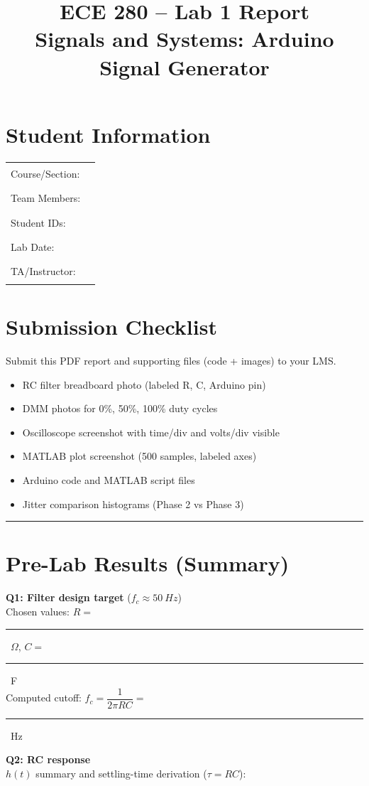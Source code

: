 \documentclass[11pt,letterpaper]{article}
\title{ECE 280 -- Lab 1 Report\\Signals and Systems: Arduino Signal Generator}
\author{}
\date{}
\newcommand{\blank}{\rule{2.2in}{0.4pt}}
\newcommand{\shortblank}{\rule{1.2in}{0.4pt}}
\newcommand{\answerbox}[1]{\fbox{\parbox[c][#1][t]{\linewidth}{}}}
\begin{document}
\maketitle

\section*{Student Information}
\begin{tabular}{@{}ll@{}}
Course/Section: & \blank \\
Team Members: & \blank \\
Student IDs: & \blank \\
Lab Date: & \blank \\
TA/Instructor: & \blank \\
\end{tabular}

\section*{Submission Checklist}
Submit this PDF report and supporting files (code + images) to your LMS.
\begin{itemize}[leftmargin=1.2em]
    \item RC filter breadboard photo (labeled R, C, Arduino pin)
    \item DMM photos for 0\%, 50\%, 100\% duty cycles
    \item Oscilloscope screenshot with time/div and volts/div visible
    \item MATLAB plot screenshot (500 samples, labeled axes)
    \item Arduino code and MATLAB script files
    \item Jitter comparison histograms (Phase 2 vs Phase 3)
\end{itemize}

\hrule

\section{Pre-Lab Results (Summary)}
\textbf{Q1: Filter design target} ($f_c \approx \SI{50}{Hz}$)\\
Chosen values: $R =$ \shortblank\ $\Omega$, $C =$ \shortblank\ F\\
Computed cutoff: $f_c = \dfrac{1}{2\pi RC} =$ \shortblank\ Hz

\textbf{Q2: RC response}\\
$h(t)$ summary and settling-time derivation ($\tau = RC$):
\answerbox{1.2in}
\end{document}
